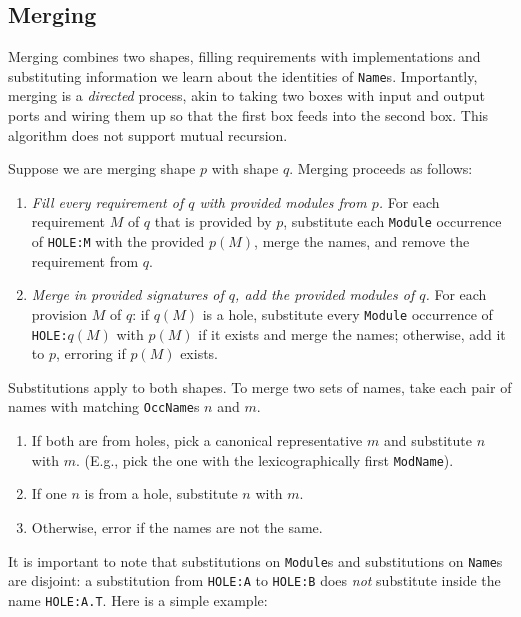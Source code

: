 \documentclass{article}
\begin{document}
\newpage

\subsection{Merging}

Merging combines two shapes, filling requirements with implementations
and substituting information we learn about the identities of
\verb|Name|s.  Importantly, merging is a \emph{directed} process, akin
to taking two boxes with input and output ports and wiring them up so
that the first box feeds into the second box.  This algorithm does not
support mutual recursion.

Suppose we are merging shape $p$ with shape $q$.  Merging proceeds as follows:

\begin{enumerate}
    \item \emph{Fill every requirement of $q$ with provided modules from
        $p$.} For each requirement $M$ of $q$ that is provided by $p$,
        substitute each \verb|Module| occurrence of \verb|HOLE:M| with the
        provided $p(M)$, merge the names, and remove the requirement from $q$.
    \item \emph{Merge in provided signatures of $q$, add the provided modules of $q$.}
        For each provision $M$ of $q$: if $q(M)$ is a hole, substitute every
        \verb|Module| occurrence of \verb|HOLE:|$q(M)$ with $p(M)$ if it exists and merge
        the names; otherwise, add it to $p$, erroring if $p(M)$ exists.
\end{enumerate}

Substitutions apply to both shapes.  To merge two sets of names, take
each pair of names with matching \verb|OccName|s $n$ and $m$.

\begin{enumerate}
    \item If both are from holes, pick a canonical representative $m$ and substitute $n$ with $m$. (E.g., pick the one with the lexicographically first \verb|ModName|).
    \item If one $n$ is from a hole, substitute $n$ with $m$.
    \item Otherwise, error if the names are not the same.
\end{enumerate}

It is important to note that substitutions on \verb|Module|s and substitutions on
\verb|Name|s are disjoint: a substitution from \verb|HOLE:A| to \verb|HOLE:B|
does \emph{not} substitute inside the name \verb|HOLE:A.T|.
Here is a simple example:
\end{document}
